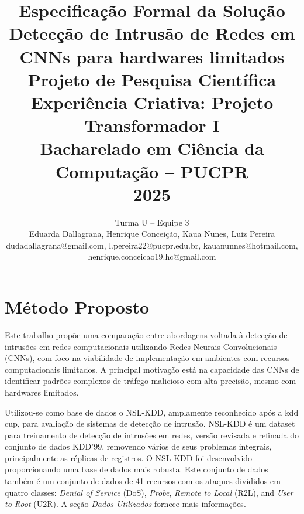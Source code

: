 \documentclass[conference]{IEEEtran}
\begin{document}

\title{Especificação Formal da Solução\\
\vspace{0.4cm}
Detecção de Intrusão de Redes em CNNs para hardwares limitados\\
\vspace{0.4cm}
{\Large Projeto de Pesquisa Científica\\
Experiência Criativa: Projeto Transformador I\\
Bacharelado em Ciência da Computação -- PUCPR\\
2025}}

\author{
    Turma {U} -- Equipe {3} \\
    Eduarda Dallagrana, Henrique Conceição, Kaua Nunes, Luiz Pereira\\
    {\centering\small dudadallagrana@gmail.com, l.pereira22@pucpr.edu.br, kauanunnes@hotmail.com, henrique.conceicao19.hc@gmail.com}
}


\maketitle

\section{Método Proposto}

    Este trabalho propõe uma comparação entre abordagens voltada à detecção de intrusões em redes computacionais utilizando Redes Neurais Convolucionais (CNNs), com foco na viabilidade de implementação em ambientes com recursos computacionais limitados. A principal motivação está na capacidade das CNNs de identificar padrões complexos de tráfego malicioso com alta precisão, mesmo com hardwares limitados.

    Utilizou-se como base de dados o NSL-KDD, amplamente reconhecido após a kdd cup, para avaliação de sistemas de detecção de intrusão. NSL-KDD é um dataset para treinamento de detecção de intrusões em redes, versão revisada e refinada do conjunto de dados KDD'99, removendo vários de seus problemas integrais, principalmente as réplicas de registros. O NSL-KDD foi desenvolvido proporcionando uma base de dados mais robusta\cite{b15}.
    Este conjunto de dados também é um conjunto de dados de 41 recursos com os ataques divididos em quatro classes:\textit{ Denial of Service }(DoS),\textit{ Probe},\textit{ Remote to Local} (R2L), and \textit{User to Root} (U2R). A seção\textit{ Dados Utilizados} fornece mais informações.
    
\end{document}

